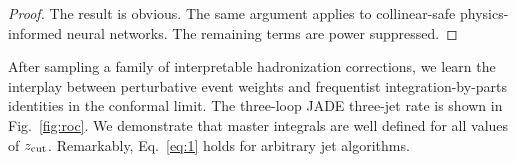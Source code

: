 \begin{proof}
The result is obvious. The same argument applies to collinear-safe
physics-informed neural networks. The remaining terms are power
suppressed.
\end{proof}

After sampling a family of interpretable hadronization corrections, we
learn the interplay between perturbative event weights and frequentist
integration-by-parts identities in the conformal limit. The three-loop
JADE three-jet rate is shown in Fig.~\ref{fig:roc}. We demonstrate that
master integrals are well defined for all values of $z_{\rm cut}$.
Remarkably, Eq.~\eqref{eq:1} holds for arbitrary jet algorithms.

